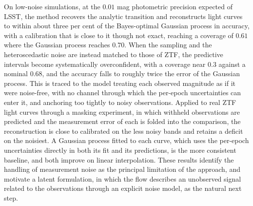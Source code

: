 On low-noise simulations, at the $0.01$ mag photometric precision expected of LSST, the method recovers the analytic transition and reconstructs light curves to within about three per cent of the Bayes-optimal Gaussian process in accuracy, with a calibration that is close to it though not exact, reaching a coverage of $0.61$ where the Gaussian process reaches $0.70$. When the sampling and the heteroscedastic noise are instead matched to those of ZTF, the predictive intervals become systematically overconfident, with a coverage near $0.3$ against a nominal $0.68$, and the accuracy falls to roughly twice the error of the Gaussian process. This is traced to the model treating each observed magnitude as if it were noise-free, with no channel through which the per-epoch uncertainties can enter it, and anchoring too tightly to noisy observations. Applied to real ZTF light curves through a masking experiment, in which withheld observations are predicted and the measurement error of each is folded into the comparison, the reconstruction is close to calibrated on the less noisy bands and retains a deficit on the noisiest. A Gaussian process fitted to each curve, which uses the per-epoch uncertainties directly in both its fit and its predictions, is the more consistent baseline, and both improve on linear interpolation. These results identify the handling of measurement noise as the principal limitation of the approach, and motivate a latent formulation, in which the flow describes an unobserved signal related to the observations through an explicit noise model, as the natural next step.


\clearpage